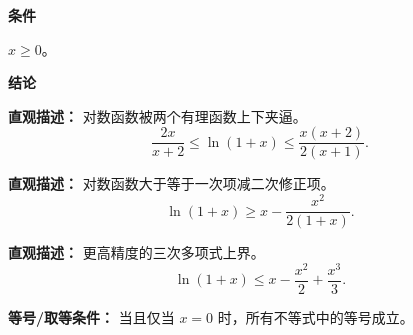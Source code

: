 \begin{statementbox}

\textbf{\textcolor{CStatement}{条件}}
\begin{description}[style=nextline, leftmargin=2.8em, labelsep=0.5em, itemsep=0.35em]
    \item[\textbf{\textcolor{CStatement}{条件 1（非负变量）：}}] $x \geq 0$。
\end{description}

\textbf{\textcolor{CStatement}{结论}}
\begin{description}[style=nextline, leftmargin=2.8em, labelsep=0.5em, itemsep=0.45em]
    \item[\textbf{\textcolor{CStatement}{结论一（稳健双边）：}}]
    \textbf{\textcolor{CStatement}{直观描述：}} 对数函数被两个有理函数上下夹逼。
    \[
    \frac{2x}{x+2} \leq \ln(1+x) \leq \frac{x(x+2)}{2(x+1)}.
    \]

    \item[\textbf{\textcolor{CStatement}{结论二（标准下界）：}}]
    \textbf{\textcolor{CStatement}{直观描述：}} 对数函数大于等于一次项减二次修正项。
    \[
    \ln(1+x) \geq x - \frac{x^{2}}{2(1+x)}.
    \]

    \item[\textbf{\textcolor{CStatement}{推广结论（三阶上界）：}}]
    \textbf{\textcolor{CStatement}{直观描述：}} 更高精度的三次多项式上界。
    \[
    \ln(1+x) \leq x - \frac{x^{2}}{2} + \frac{x^{3}}{3}.
    \]
\end{description}

\textbf{\textcolor{CStatement}{等号/取等条件：}} 当且仅当 $x=0$ 时，所有不等式中的等号成立。

\end{statementbox}
